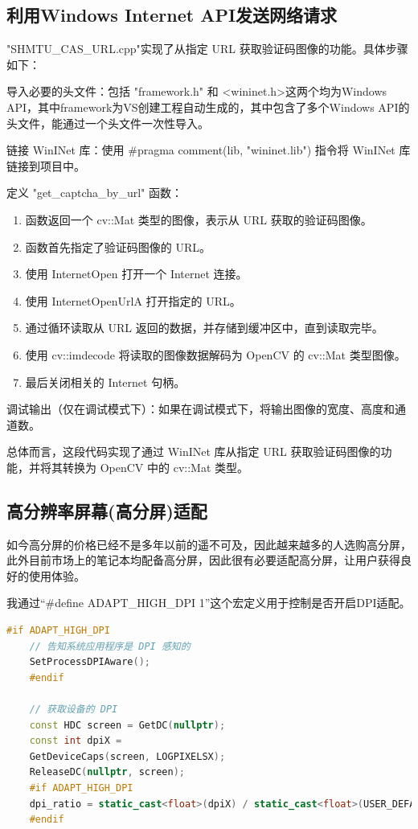 \subsection{利用Windows Internet API发送网络请求}

"SHMTU\_CAS\_URL.cpp"实现了从指定 URL 获取验证码图像的功能。具体步骤如下：

导入必要的头文件：包括 "framework.h" 和 <wininet.h>这两个均为Windows API，其中framework为VS创建工程自动生成的，其中包含了多个Windows API的头文件，能通过一个头文件一次性导入。

链接 WinINet 库：使用 \#pragma comment(lib, "wininet.lib") 指令将 WinINet 库链接到项目中。

定义 "{get\_captcha\_by\_url}" 函数：

\begin{enumerate}
	\item 函数返回一个 cv::Mat 类型的图像，表示从 URL 获取的验证码图像。
	\item 函数首先指定了验证码图像的 URL。
	\item 使用 InternetOpen 打开一个 Internet 连接。
	\item 使用 InternetOpenUrlA 打开指定的 URL。
	\item 通过循环读取从 URL 返回的数据，并存储到缓冲区中，直到读取完毕。
	\item 使用 cv::imdecode 将读取的图像数据解码为 OpenCV 的 cv::Mat 类型图像。
	\item 最后关闭相关的 Internet 句柄。
\end{enumerate}

调试输出（仅在调试模式下）：如果在调试模式下，将输出图像的宽度、高度和通道数。

总体而言，这段代码实现了通过 WinINet 库从指定 URL 获取验证码图像的功能，并将其转换为 OpenCV 中的 cv::Mat 类型。

\subsection{高分辨率屏幕(高分屏)适配}

如今高分屏的价格已经不是多年以前的遥不可及，因此越来越多的人选购高分屏，
此外目前市场上的笔记本均配备高分屏，因此很有必要适配高分屏，让用户获得良好的使用体验。

我通过“\#define ADAPT\_HIGH\_DPI 1”这个宏定义用于控制是否开启DPI适配。

\begin{lstlisting}[caption={DPI缩放},language=C++,label=code:vc_dpi]
	#if ADAPT_HIGH_DPI
	// 告知系统应用程序是 DPI 感知的
	SetProcessDPIAware();
	#endif

	// 获取设备的 DPI
	const HDC screen = GetDC(nullptr);
	const int dpiX =
	GetDeviceCaps(screen, LOGPIXELSX);
	ReleaseDC(nullptr, screen);
	#if ADAPT_HIGH_DPI
	dpi_ratio = static_cast<float>(dpiX) / static_cast<float>(USER_DEFAULT_SCREEN_DPI);
	#endif
\end{lstlisting}

